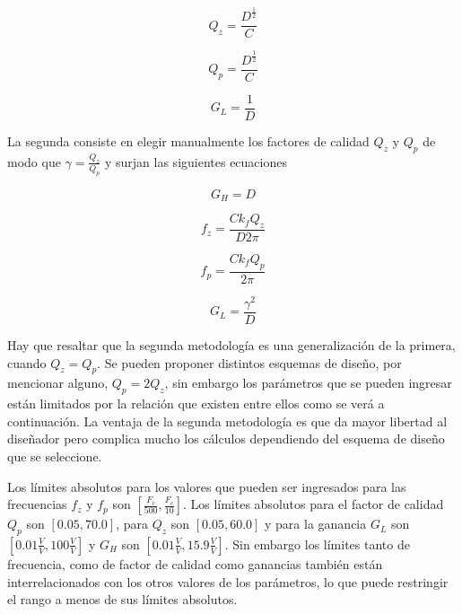 	\begin{equation}
		Q_{z} = \frac{D^{\frac{1}{2}}}{C}
	\end{equation}
	
	\begin{equation}
		Q_{p} = \frac{D^{\frac{1}{2}}}{C}	
	\end{equation}
	
	\begin{equation}
		G_{L} = \frac{1}{D}
	\end{equation}
		
	La segunda consiste en elegir manualmente los factores de calidad $Q_{z}$ y $Q_{p}$ de modo que $\displaystyle{\gamma = \frac{Q_{z}}{Q_{p}}}$ y surjan las siguientes ecuaciones
		
	\begin{equation}
		G_{H} = D
	\end{equation}
	
	\begin{equation}
		f_{z} = \frac{C k_{f} Q_{z}}{D 2 \pi}	
	\end{equation}
	
	\begin{equation}
		f_{p} = \frac{C k_{f} Q_{p}}{ 2 \pi}	
	\end{equation}
	
	\begin{equation}
		G_{L} = \frac{\gamma^{2}}{D}
	\end{equation}
	
	Hay que resaltar que la segunda metodología es una generalización de la primera, cuando $Q_{z} = Q_{p}$. Se pueden proponer distintos esquemas de diseño, por mencionar alguno, $Q_{p} = 2Q_{z}$, sin embargo los parámetros que se pueden ingresar están limitados por la relación que existen entre ellos como se verá a continuación. La ventaja de la segunda metodología es que da mayor libertad al diseñador pero complica mucho los cálculos dependiendo del esquema de diseño que se seleccione.
		
	Los límites absolutos para los valores que pueden ser ingresados para las frecuencias $f_{z}$ y $f_{p}$ son $[\frac{F_{c}}{500}, \frac{F_{c}}{10}]$. Los límites absolutos para el factor de calidad $Q_{p}$ son $[0.05, 70.0]$, para $Q_{z}$ son $[0.05, 60.0]$ y para la ganancia $G_{L}$ son $[0.01\frac{V}{V}, 100\frac{V}{V}]$ y $G_{H}$ son $[0.01\frac{V}{V}, 15.9\frac{V}{V}]$.  Sin embargo los límites tanto de frecuencia, como de factor de calidad como ganancias también están interrelacionados con los otros valores de los parámetros, lo que puede restringir el rango a menos de sus límites absolutos. 
	
